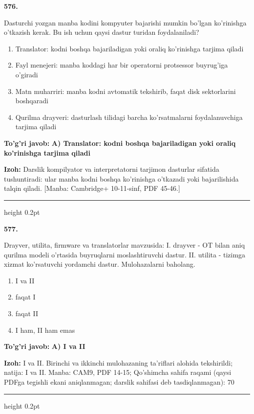 \documentclass[10pt,a4paper]{article}
\begin{document}
{\bfseries\sffamily\color{ink} 576.}
\par
Dasturchi yozgan manba kodini kompyuter bajarishi mumkin bo'lgan ko'rinishga o'tkazish kerak. Bu ish uchun qaysi dastur turidan foydalaniladi?
\begin{enumerate}[label=\Alph*),leftmargin=9mm]
\item Translator: kodni boshqa bajariladigan yoki oraliq ko'rinishga tarjima qiladi
\item Fayl menejeri: manba koddagi har bir operatorni protsessor buyrug'iga o'giradi
\item Matn muharriri: manba kodni avtomatik tekshirib, faqat disk sektorlarini boshqaradi
\item Qurilma drayveri: dasturlash tilidagi barcha ko'rsatmalarni foydalanuvchiga tarjima qiladi
\end{enumerate}
\begin{tcolorbox}[enhanced,breakable,colback=teal!4,colframe=teal!60!black,boxrule=0.45pt,arc=1.2mm,left=2.7mm,right=2.7mm,top=1.8mm,bottom=1.8mm,before skip=2mm,after skip=2mm]
{\bfseries\sffamily\color{teal}To'g'ri javob:} \textbf{A) Translator: kodni boshqa bajariladigan yoki oraliq ko'rinishga tarjima qiladi}
\par\smallskip
{\bfseries Izoh:} Darslik kompilyator va interpretatorni tarjimon dasturlar sifatida tushuntiradi: ular manba kodni boshqa ko'rinishga o'tkazadi yoki bajarilishida talqin qiladi. [Manba: Cambridge+ 10-11-sinf, PDF 45-46.]
\end{tcolorbox}
\vspace{2mm}\hrule height 0.2pt\vspace{3mm}

{\bfseries\sffamily\color{ink} 577.}
\par
Drayver, utilita, firmware va translatorlar mavzusida: I. drayver - OT bilan aniq qurilma modeli o'rtasida buyruqlarni moslashtiruvchi dastur. II. utilita - tizimga xizmat ko'rsatuvchi yordamchi dastur. Mulohazalarni baholang.
\begin{enumerate}[label=\Alph*),leftmargin=9mm]
\item I va II
\item faqat I
\item faqat II
\item I ham, II ham emas
\end{enumerate}
\begin{tcolorbox}[enhanced,breakable,colback=teal!4,colframe=teal!60!black,boxrule=0.45pt,arc=1.2mm,left=2.7mm,right=2.7mm,top=1.8mm,bottom=1.8mm,before skip=2mm,after skip=2mm]
{\bfseries\sffamily\color{teal}To'g'ri javob:} \textbf{A) I va II}
\par\smallskip
{\bfseries Izoh:} I va II. Birinchi va ikkinchi mulohazaning ta'riflari alohida tekshirildi; natija: I va II. Manba: CAM9, PDF 14-15; Qo'shimcha sahifa raqami (qaysi PDFga tegishli ekani aniqlanmagan; darslik sahifasi deb tasdiqlanmagan): 70
\end{tcolorbox}
\vspace{2mm}\hrule height 0.2pt\vspace{3mm}
\end{document}
